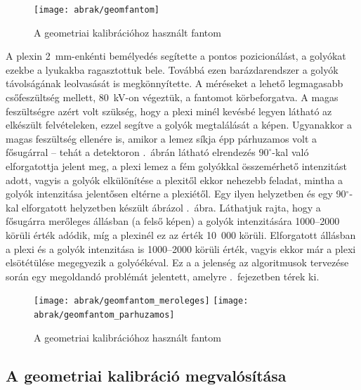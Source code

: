 \documentclass[a4paper,12pt]{article}
\begin{document}
\begin{figure}[htbp]
\center
\texttt{[image: abrak/geomfantom]}
\caption{A geometriai kalibrációhoz használt fantom}
\label{fig:geomfantom}
\end{figure}


 A plexin 2~mm-enkénti bemélyedés segítette a pontos pozicionálást, a golyókat ezekbe a lyukakba ragasztottuk bele. Továbbá ezen barázdarendszer a golyók távolságának leolvasását is megkönnyítette. A méréseket a lehető legmagasabb csőfeszültség mellett, 80~kV-on végeztük, a fantomot körbeforgatva. A magas feszültségre azért volt szükség, hogy a plexi minél kevésbé legyen látható az elkészült felvételeken, ezzel segítve a golyók megtalálását a képen. Ugyanakkor a magas feszültség ellenére is, amikor a lemez síkja épp párhuzamos volt a fősugárral -- tehát a detektoron .~ábrán látható elrendezés $90^\circ$-kal való elforgatottja jelent meg, a plexi lemez a fém golyókkal összemérhető intenzitást adott, vagyis a golyók elkülönítése a plexitől ekkor nehezebb feladat, mintha a golyók intenzitása jelentősen eltérne a plexiétől. Egy ilyen helyzetben és egy 90$^\circ$-kal elforgatott helyzetben készült ábrázol .~ábra. Láthatjuk rajta, hogy a fősugárra merőleges állásban (a felső képen) a golyók intenzitására 1000--2000 körüli érték adódik, míg a plexinél ez az érték 10~000 körüli. Elforgatott állásban a plexi és a golyók intenzitása is 1000--2000 körüli érték, vagyis ekkor már a plexi elsötétülése megegyezik a golyóékéval. Ez a a jelenség az algoritmusok tervezése során egy megoldandó problémát jelentett, amelyre .~fejezetben térek ki.






\begin{figure}[htbp]
\center
\texttt{[image: abrak/geomfantom\_meroleges]}
\texttt{[image: abrak/geomfantom\_parhuzamos]}
\caption{A geometriai kalibrációhoz használt fantom}
\label{fig:geomfantom_plexi}
\end{figure}







\subsection{A geometriai kalibráció megvalósítása}
\end{document}

